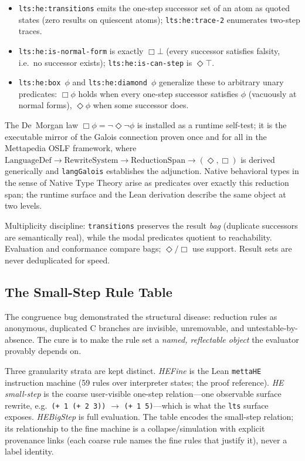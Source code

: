 \documentclass[11pt]{article}
\newcommand{\code}[1]{\texttt{#1}}
\begin{document}
\begin{itemize}
\item \code{lts:he:transitions} emits the one-step successor set
  of an atom as quoted states (zero results on quiescent atoms);
  \code{lts:he:trace-2} enumerates two-step traces.
\item \code{lts:he:is-normal-form} is exactly $\Box\bot$ (every
  successor satisfies falsity, i.e.\ no successor exists);
  \code{lts:he:is-can-step} is $\Diamond\top$.
\item \code{lts:he:box}~$\phi$ and \code{lts:he:diamond}~$\phi$
  generalize these to arbitrary unary predicates: $\Box\phi$ holds
  when every one-step successor satisfies $\phi$ (vacuously at normal
  forms), $\Diamond\phi$ when some successor does.
\end{itemize}

The De~Morgan law $\Box\phi = \lnot\Diamond\lnot\phi$ is installed as
a runtime self-test; it is the executable mirror of the Galois
connection proven once and for all in the Mettapedia OSLF framework,
where $\mathrm{LanguageDef}\to\mathrm{RewriteSystem}\to
\mathrm{ReductionSpan}\to(\Diamond,\Box)$ is derived generically and
\code{langGalois} establishes the adjunction.  Native behavioral types
in the sense of Native Type Theory arise as predicates over exactly
this reduction span; the runtime surface and the Lean derivation
describe the same object at two levels.

Multiplicity discipline: \code{transitions} preserves the result
\emph{bag} (duplicate successors are semantically real), while the
modal predicates quotient to reachability.  Evaluation and conformance
compare bags; $\Diamond/\Box$ use support.  Result sets are never
deduplicated for speed.

\subsection{The Small-Step Rule Table}
\label{sec:langdefpack}

The congruence bug demonstrated the structural disease: reduction
rules as anonymous, duplicated C branches are invisible, unremovable,
and untestable-by-absence.  The cure is to make the rule set a
\emph{named, reflectable object} the evaluator provably depends on.

Three granularity strata are kept distinct.  \emph{HEFine} is the Lean
\code{mettaHE} instruction machine (59 rules over interpreter states;
the proof reference).  \emph{HE small-step} is the coarse user-visible
one-step relation---one observable surface rewrite, e.g.\
\code{(+ 1 (+ 2 3))} $\to$ \code{(+ 1 5)}---which is what the
\code{lts} surface exposes.  \emph{HEBigStep} is full evaluation.  The
table encodes the small-step relation; its relationship to the fine machine is a
collapse/simulation with explicit provenance links (each coarse rule
names the fine rules that justify it), never a label identity.
\end{document}
